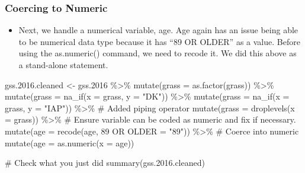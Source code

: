 \documentclass[
  letterpaper,
  DIV=11,
  numbers=noendperiod]{scrreprt}
\newenvironment{Shaded}{\begin{snugshade}}{\end{snugshade}}
\newcommand{\AttributeTok}[1]{\textcolor[rgb]{0.40,0.45,0.13}{#1}}
\newcommand{\CommentTok}[1]{\textcolor[rgb]{0.37,0.37,0.37}{#1}}
\newcommand{\FloatTok}[1]{\textcolor[rgb]{0.68,0.00,0.00}{#1}}
\newcommand{\FunctionTok}[1]{\textcolor[rgb]{0.28,0.35,0.67}{#1}}
\newcommand{\NormalTok}[1]{\textcolor[rgb]{0.00,0.23,0.31}{#1}}
\newcommand{\OtherTok}[1]{\textcolor[rgb]{0.00,0.23,0.31}{#1}}
\newcommand{\SpecialCharTok}[1]{\textcolor[rgb]{0.37,0.37,0.37}{#1}}
\newcommand{\StringTok}[1]{\textcolor[rgb]{0.13,0.47,0.30}{#1}}
\providecommand{\tightlist}{%
  \setlength{\itemsep}{0pt}\setlength{\parskip}{0pt}}\usepackage{longtable,booktabs,array}
\begin{document}
\subsubsection{Coercing to Numeric}\label{coercing-to-numeric}

\begin{itemize}
\tightlist
\item
  Next, we handle a numerical variable, age. Age again has an issue
  being able to be numerical data type because it has ``89 OR OLDER'' as
  a value. Before using the as.numeric() command, we need to recode it.
  We did this above as a stand-alone statement.\\
\end{itemize}

\begin{Shaded}
\begin{Highlighting}[]
\NormalTok{gss.}\FloatTok{2016.}\NormalTok{cleaned }\OtherTok{\textless{}{-}}\NormalTok{ gss}\FloatTok{.2016} \SpecialCharTok{\%\textgreater{}\%}
    \FunctionTok{mutate}\NormalTok{(}\AttributeTok{grass =} \FunctionTok{as.factor}\NormalTok{(grass)) }\SpecialCharTok{\%\textgreater{}\%}
    \FunctionTok{mutate}\NormalTok{(}\AttributeTok{grass =} \FunctionTok{na\_if}\NormalTok{(}\AttributeTok{x =}\NormalTok{ grass, }\AttributeTok{y =} \StringTok{"DK"}\NormalTok{)) }\SpecialCharTok{\%\textgreater{}\%}
    \FunctionTok{mutate}\NormalTok{(}\AttributeTok{grass =} \FunctionTok{na\_if}\NormalTok{(}\AttributeTok{x =}\NormalTok{ grass, }\AttributeTok{y =} \StringTok{"IAP"}\NormalTok{)) }\SpecialCharTok{\%\textgreater{}\%}
    \CommentTok{\# Added piping operator}
\FunctionTok{mutate}\NormalTok{(}\AttributeTok{grass =} \FunctionTok{droplevels}\NormalTok{(}\AttributeTok{x =}\NormalTok{ grass)) }\SpecialCharTok{\%\textgreater{}\%}
    \CommentTok{\# Ensure variable can be coded as numeric and fix if necessary.}
\FunctionTok{mutate}\NormalTok{(}\AttributeTok{age =} \FunctionTok{recode}\NormalTok{(age, }\StringTok{\textasciigrave{}}\AttributeTok{89 OR OLDER}\StringTok{\textasciigrave{}} \OtherTok{=} \StringTok{"89"}\NormalTok{)) }\SpecialCharTok{\%\textgreater{}\%}
    \CommentTok{\# Coerce into numeric}
\FunctionTok{mutate}\NormalTok{(}\AttributeTok{age =} \FunctionTok{as.numeric}\NormalTok{(}\AttributeTok{x =}\NormalTok{ age))}

\CommentTok{\# Check what you just did}
\FunctionTok{summary}\NormalTok{(gss.}\FloatTok{2016.}\NormalTok{cleaned)}
\end{Highlighting}
\end{Shaded}
\end{document}
